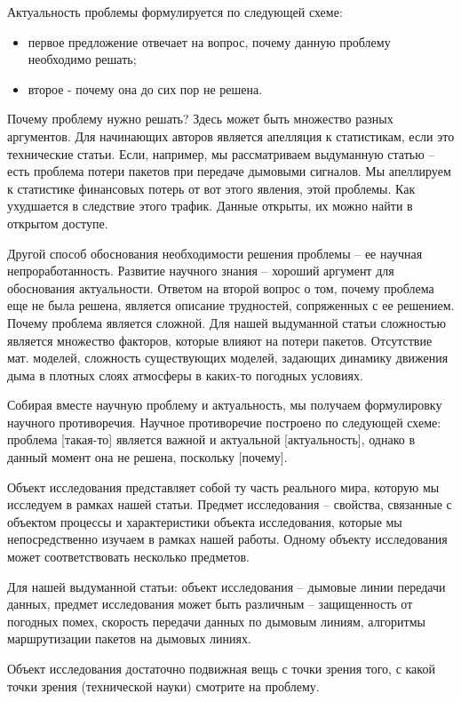 \documentclass{report}
\begin{document}
Актуальность проблемы формулируется по следующей схеме:
\begin{itemize}
	\item первое предложение отвечает на вопрос, почему данную проблему необходимо решать;
	\item второе - почему она до сих пор не решена.
\end{itemize}

Почему проблему нужно решать? Здесь может быть множество разных аргументов. Для начинающих авторов является апелляция к статистикам, если это технические статьи. Если, например, мы рассматриваем выдуманную статью – есть проблема потери пакетов при передаче дымовыми сигналов. Мы апеллируем к статистике финансовых потерь от вот этого явления, этой проблемы. Как ухудшается в следствие этого трафик. Данные открыты, их можно найти в открытом доступе.

Другой способ обоснования необходимости решения проблемы – ее научная непроработанность. Развитие научного знания – хороший аргумент для обоснования актуальности. Ответом на второй вопрос о том, почему проблема еще не была решена, является описание трудностей, сопряженных с ее решением. Почему проблема является сложной. Для нашей выдуманной статьи сложностью является множество факторов, которые влияют на потери пакетов. Отсутствие мат. моделей, сложность существующих моделей, задающих динамику движения дыма в плотных слоях атмосферы в каких-то погодных условиях.

Собирая вместе научную проблему и актуальность, мы получаем формулировку научного противоречия. Научное противоречие построено по следующей схеме: проблема [такая-то] является важной и актуальной [актуальность], однако в данный момент она не решена, поскольку [почему].

Объект исследования представляет собой ту часть реального мира, которую мы исследуем в рамках нашей статьи. Предмет исследования -- свойства, связанные с объектом процессы и характеристики объекта исследования, которые мы непосредственно изучаем в рамках нашей работы. Одному объекту исследования может соответствовать несколько предметов.

Для нашей выдуманной статьи: объект исследования -- дымовые линии передачи данных, предмет исследования может быть различным -- защищенность от погодных помех, скорость передачи данных по дымовым линиям, алгоритмы маршрутизации пакетов на дымовых линиях.

Объект исследования достаточно подвижная вещь с точки зрения того, с какой точки зрения (технической науки) смотрите на проблему.
\end{document}
